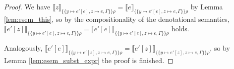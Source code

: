 \documentclass{scrartcl}
\newtheorem{lemma}{Lemma}
\theoremstyle{nonumberbreak}
\newtheorem{proof}{Proof}
\newcommand{\sApp}[2]{#1\;#2}
\newcommand{\dom}[1]{\text{dom}\;#1}
\newcommand{\dsem}[2]{\llbracket #1 \rrbracket_{#2}}
\newcommand{\esem}[1]{\{\!\!\!\{#1\}\!\!\!\}}
\begin{document}
\begin{proof}
We have
$\dsem{z}{\esem{y \mapsto e'[e], z \mapsto e, \Gamma}\rho} = \dsem{e}{\esem{y \mapsto e'[e], z \mapsto e, \Gamma}\rho}$ by Lemma \ref{lem:esem_this}, so by the compositionality of the denotational semantics, $\dsem{e'[z]}{{\esem{y \mapsto e'[e], z \mapsto e, \Gamma}\rho}} = \dsem{e'[e]}{{\esem{y \mapsto e'[e], z \mapsto e, \Gamma}\rho}}$ holds.

Analogously, $\dsem{e'[e]}{{\esem{y \mapsto e'[z], z \mapsto e, \Gamma}\rho}} = \dsem{e'[z]}{{\esem{y \mapsto e'[z], z \mapsto e, \Gamma}\rho}}$, so by Lemma \ref{lem:esem_subst_expr} the proof is finished.
\end{proof}

%
%
%
%
\end{document}
